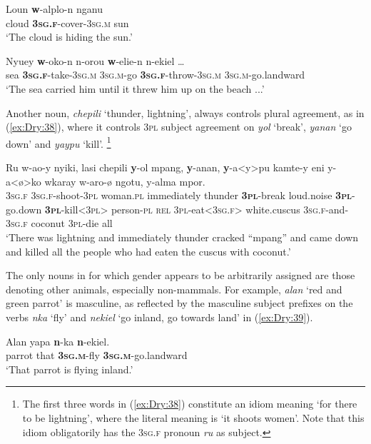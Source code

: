\documentclass[output=collectionpaper]{langsci/langscibook}
\begin{document}
\ea \label{ex:Dry:36}
\gll Loun	\textbf{w}-alplo-n	nganu\\
cloud \textbf{\textsc{3sg.f}}-cover-\textsc{3sg.m} sun\\
\glt `The cloud is hiding the sun.'
\z

\ea \label{ex:Dry:37}
\gll Nyuey	\textbf{w}-oko-n	n-orou	\textbf{w}-elie-n {n-ekiel \ldots} \\
sea \textbf{\textsc{3sg.f}}-take-\textsc{3sg.m} \textsc{3sg.m}-go \textbf{\textsc{3sg.f}}-throw-\textsc{3sg.m} \textsc{3sg.m}-go.landward \\
\glt `The sea carried him until it threw him up on the beach ...'
\z

Another noun, \textit{chepili} `thunder, lightning', always controls plural agreement, as in (\ref{ex:Dry:38}), where it controls \textsc{3pl} subject agreement on \textit{yol} `break', \textit{yanan} `go down' and \textit{yaypu} `kill'.%
\footnote{The first three words in (\ref{ex:Dry:38}) constitute an idiom meaning `for there to be lightning', where the literal meaning is `it shoots women'. Note that this idiom obligatorily has the \textsc{3sg.f} pronoun \textit{ru} as subject.}

\ea \label{ex:Dry:38}
\gll Ru	w-ao-y	nyiki,	lasi	chepili \textbf{y}-ol	mpang,	\textbf{y}-anan,	\textbf{y}-a<y>pu kamte-y	eni	y-a<ø>ko	wkaray w-aro-ø	ngotu,	y-alma	mpor.\\
\textsc{3sg.f} \textsc{3sg.f}-shoot-\textsc{3pl} woman.\textsc{pl} immediately  thunder \textbf{\textsc{3pl}}-break loud.noise \textbf{\textsc{3pl}}-go.down \textbf{\textsc{3pl}}-kill<\textsc{3pl}>  person-\textsc{pl} \textsc{rel} \textsc{3pl}-eat<\textsc{3sg.f}> white.cuscus
\textsc{3sg.f}-and-\textsc{3sg.f} coconut \textsc{3pl}-die all\\
\glt `There was lightning and immediately thunder cracked ``mpang'' and came down and killed all the people who had eaten the cuscus with coconut.'
\z

The only nouns in  for which gender appears to be arbitrarily assigned are those denoting other animals, especially non-mammals. For example, \textit{alan} `red and green parrot' is masculine, as reflected by the masculine subject prefixes on the verbs \textit{nka} `fly' and \textit{nekiel} `go inland, go towards land' in (\ref{ex:Dry:39}).

\ea \label{ex:Dry:39}
\gll Alan	yapa	\textbf{n}-ka	\textbf{n}-ekiel.\\
parrot that \textbf{\textsc{3sg.m}}-fly \textbf{\textsc{3sg.m}}-go.landward\\
\glt  `That parrot is flying inland.'
\z
\end{document}
